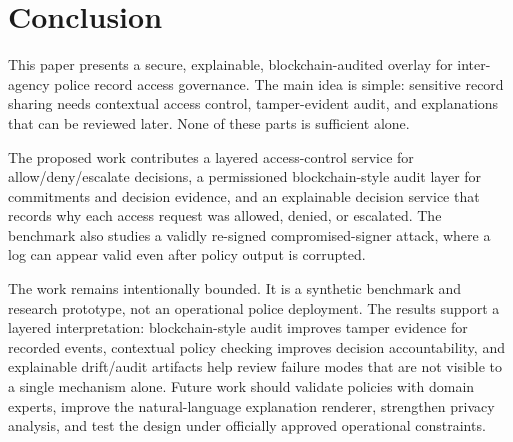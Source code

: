 \section{Conclusion}
\label{sec:conclusion}

This paper presents a secure, explainable, blockchain-audited overlay for
inter-agency police record access governance. The main idea is simple:
sensitive record sharing needs contextual access control, tamper-evident audit,
and explanations that can be reviewed later. None of these parts is sufficient
alone.

The proposed work contributes a layered access-control service for
allow/deny/escalate decisions, a permissioned blockchain-style audit layer for
commitments and decision evidence, and an explainable decision service that
records why each access request was allowed, denied, or escalated. The
benchmark also studies a validly re-signed compromised-signer attack, where a
log can appear valid even after policy output is corrupted.

The work remains intentionally bounded. It is a synthetic benchmark and
research prototype, not an operational police deployment. The results support
a layered interpretation: blockchain-style audit improves tamper evidence for
recorded events, contextual policy checking improves decision accountability,
and explainable drift/audit artifacts help review failure modes that are not
visible to a single mechanism alone. Future work should validate policies with
domain experts, improve the natural-language explanation renderer, strengthen
privacy analysis, and test the design under officially approved operational
constraints.
